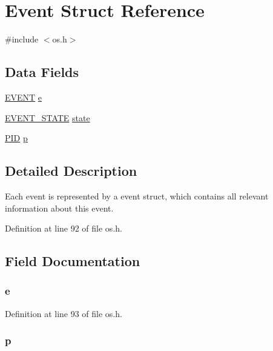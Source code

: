\hypertarget{struct_event}{}\section{Event Struct Reference}
\label{struct_event}


{\ttfamily \#include $<$os.\+h$>$}

\subsection*{Data Fields}
\begin{DoxyCompactItemize}
\item 
\hyperlink{os_8h_a3b95dbfce5db28a04d9387963a3f3708}{E\+V\+E\+NT} \hyperlink{struct_event_a90545f7fef210012e655bc61f2a4cd22}{e}
\item 
\hyperlink{os_8h_a5c32a61b1e9f4d35d9f5cbfb3bf7626c}{E\+V\+E\+N\+T\+\_\+\+S\+T\+A\+TE} \hyperlink{struct_event_ae3be0d78000920b3d5ebc4be1480d438}{state}
\item 
\hyperlink{os_8h_aa4f4d03691545cda70a42801c8b9096b}{P\+ID} \hyperlink{struct_event_a29d3134ed439391d0cda6a328e877bb1}{p}
\end{DoxyCompactItemize}


\subsection{Detailed Description}
Each event is represented by a event struct, which contains all relevant information about this event. 

Definition at line 92 of file os.\+h.



\subsection{Field Documentation}
\subsubsection[{\texorpdfstring{e}{e}}]{ e}\hypertarget{struct_event_a90545f7fef210012e655bc61f2a4cd22}{}\label{struct_event_a90545f7fef210012e655bc61f2a4cd22}


Definition at line 93 of file os.\+h.

\subsubsection[{\texorpdfstring{p}{p}}]{ p}\hypertarget{struct_event_a29d3134ed439391d0cda6a328e877bb1}{}\label{struct_event_a29d3134ed439391d0cda6a328e877bb1}


